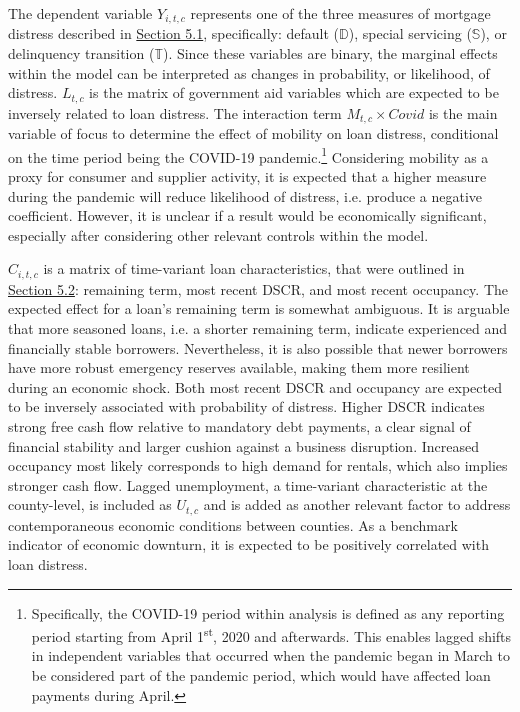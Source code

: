 \documentclass[11pt]{article} %
\begin{document}
The dependent variable $Y_{i,t,c}$ represents one of the three measures of mortgage distress described in \hyperlink{Defining Commercial Mortgage Distress}{Section 5.1}, specifically: default ($\mathbb{D}$), special servicing ($\mathbb{S}$), or delinquency transition ($\mathbb{T}$). Since these variables are binary, the marginal effects within the model can be interpreted as changes in probability, or likelihood, of distress. $L_{t,c}$ is the matrix of government aid variables which are expected to be inversely related to loan distress. The interaction term $M_{t,c}\times Covid$ is the main variable of focus to determine the effect of mobility on loan distress, conditional on the time period being the COVID-19 pandemic.\footnote{Specifically, the COVID-19 period within analysis is defined as any reporting period starting from April 1\textsuperscript{st}, 2020 and afterwards. This enables lagged shifts in independent variables that occurred when the pandemic began in March to be considered part of the pandemic period, which would have affected loan payments during April.} Considering mobility as a proxy for consumer and supplier activity, it is expected that a higher measure during the pandemic will reduce likelihood of distress, i.e. produce a negative coefficient. However, it is unclear if a result would be economically significant, especially after considering other relevant controls within the model.

$C_{i,t,c}$ is a matrix of time-variant loan characteristics, that were outlined in \hyperlink{Time-Variant}{Section 5.2}: remaining term, most recent DSCR, and most recent occupancy. The expected effect for a loan's remaining term is somewhat ambiguous. It is arguable that more seasoned loans, i.e. a shorter remaining term, indicate experienced and financially stable borrowers. Nevertheless, it is also possible that newer borrowers have more robust emergency reserves available, making them more resilient during an economic shock. Both most recent DSCR and occupancy are expected to be inversely associated with probability of distress. Higher DSCR indicates strong free cash flow relative to mandatory debt payments, a clear signal of financial stability and larger cushion against a business disruption. Increased occupancy most likely corresponds to high demand for rentals, which also implies stronger cash flow. Lagged unemployment, a time-variant characteristic at the county-level, is included as $U_{t,c}$ and is added as another relevant factor to address contemporaneous economic conditions between counties. As a benchmark indicator of economic downturn, it is expected to be positively correlated with loan distress. 
\end{document}
